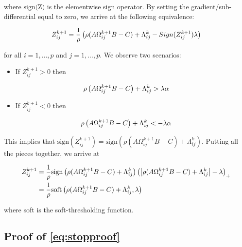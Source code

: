 \documentclass[11pt,]{report}
\providecommand{\tightlist}{%
  \setlength{\itemsep}{0pt}\setlength{\parskip}{0pt}}
\begin{document}
where \(\mbox{sign(Z)}\) is the elementwise sign operator. By setting the gradient/sub-differential equal to zero, we arrive at the following equivalence:

\begin{equation}
Z_{ij}^{k + 1} = \frac{1}{\rho}\left( \rho(A\Omega_{ij}^{k + 1}B - C) + \Lambda_{ij}^{k} - Sign(Z_{ij}^{k + 1})\lambda \right)
\label{eq:ZZsoftproof2}\notag
\end{equation}

for all \(i = 1,..., p\) and \(j = 1,..., p\). We observe two scenarios:

\begin{itemize}
\tightlist
\item
  If \(Z_{ij}^{k + 1} > 0\) then
\end{itemize}

\begin{equation}
\rho\left(A\Omega_{ij}^{k + 1}B - C\right) + \Lambda_{ij}^{k} > \lambda\alpha \notag
\end{equation}

\begin{itemize}
\tightlist
\item
  If \(Z_{ij}^{k + 1} < 0\) then
\end{itemize}

\begin{equation}
\rho\left(A\Omega_{ij}^{k + 1}B - C\right) + \Lambda_{ij}^{k} < -\lambda\alpha \notag
\end{equation}

This implies that \(\mbox{sign}(Z_{ij}^{k + 1}) = \mbox{sign}\left(\rho(A\Omega_{ij}^{k + 1}B - C) + \Lambda_{ij}^{k}\right)\). Putting all the pieces together, we arrive at

\begin{equation}
\begin{split}
Z_{ij}^{k + 1} &= \frac{1}{\rho}\mbox{sign}\left(\rho(A\Omega_{ij}^{k + 1}B - C) + \Lambda_{ij}^{k}\right)\left( \left| \rho(A\Omega_{ij}^{k + 1}B - C) + \Lambda_{ij}^{k} \right| - \lambda \right)_{+} \\
&= \frac{1}{\rho}\mbox{soft}\left(\rho(A\Omega_{ij}^{k + 1}B - C) + \Lambda_{ij}^{k}, \lambda\right)
\label{eq:appendixZZproof2}\notag
\end{split}
\end{equation}

where soft is the soft-thresholding function.

\hypertarget{proofstopproof}{%
\subsection{Proof of \eqref{eq:stopproof}}\label{proofstopproof}}
\end{document}
